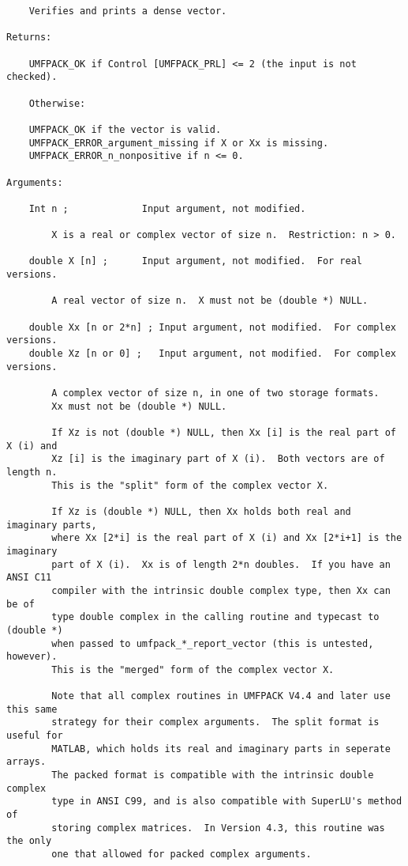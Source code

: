 \documentclass[11pt]{article}
\begin{document}
{\begin{verbatim}
    Verifies and prints a dense vector.

Returns:

    UMFPACK_OK if Control [UMFPACK_PRL] <= 2 (the input is not checked).

    Otherwise:

    UMFPACK_OK if the vector is valid.
    UMFPACK_ERROR_argument_missing if X or Xx is missing.
    UMFPACK_ERROR_n_nonpositive if n <= 0.

Arguments:

    Int n ;             Input argument, not modified.

        X is a real or complex vector of size n.  Restriction: n > 0.

    double X [n] ;      Input argument, not modified.  For real versions.

        A real vector of size n.  X must not be (double *) NULL.

    double Xx [n or 2*n] ; Input argument, not modified.  For complex versions.
    double Xz [n or 0] ;   Input argument, not modified.  For complex versions.

        A complex vector of size n, in one of two storage formats.
        Xx must not be (double *) NULL.

        If Xz is not (double *) NULL, then Xx [i] is the real part of X (i) and
        Xz [i] is the imaginary part of X (i).  Both vectors are of length n.
        This is the "split" form of the complex vector X.

        If Xz is (double *) NULL, then Xx holds both real and imaginary parts,
        where Xx [2*i] is the real part of X (i) and Xx [2*i+1] is the imaginary
        part of X (i).  Xx is of length 2*n doubles.  If you have an ANSI C11
        compiler with the intrinsic double complex type, then Xx can be of
        type double complex in the calling routine and typecast to (double *)
        when passed to umfpack_*_report_vector (this is untested, however).
        This is the "merged" form of the complex vector X.

        Note that all complex routines in UMFPACK V4.4 and later use this same
        strategy for their complex arguments.  The split format is useful for
        MATLAB, which holds its real and imaginary parts in seperate arrays.
        The packed format is compatible with the intrinsic double complex
        type in ANSI C99, and is also compatible with SuperLU's method of
        storing complex matrices.  In Version 4.3, this routine was the only
        one that allowed for packed complex arguments.


\end{verbatim}}
\end{document}
